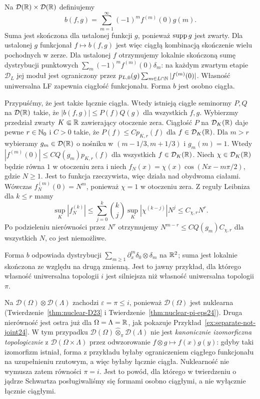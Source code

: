 \begin{przyklad}
\label{ex:separate-not-joint24}
Na $\mathcal D(\mathbb R)\times\mathcal D(\mathbb R)$ definiujemy
\[
 b(f,g)=\sum_{m=1}^\infty (-1)^m f^{(m)}(0)g(m).
\]
Suma jest skończona dla ustalonej funkcji $g$, ponieważ
$\operatorname{supp} g$ jest zwarty. Dla ustalonej $g$ funkcjonał
$f\mapsto b(f,g)$ jest więc ciągłą kombinacją skończenie
wielu pochodnych w zerze. Dla ustalonej $f$ otrzymujemy
lokalnie skończoną sumę dystrybucji punktowych
$\sum_m(-1)^mf^{(m)}(0)\delta_m$: na każdym zwartym
etapie $\mathcal D_L$ jej moduł jest ograniczony przez
$p_{L,0}(g)\sum_{m\in L\cap\mathbb N}|f^{(m)}(0)|$.
Własność uniwersalna LF zapewnia ciągłość funkcjonału. Forma $b$ jest osobno ciągła.

Przypuśćmy, że jest także łącznie ciągła. Wtedy istnieją
ciągłe seminormy $P,Q$ na $\mathcal D(\mathbb R)$ takie, że
$|b(f,g)|\le P(f)Q(g)$ dla wszystkich $f,g$.
Wybierzmy przedział zwarty $K\Subset\mathbb R$ zawierający
otoczenie zera. Ciągłość $P$ na $\mathcal D_K(\mathbb R)$
daje pewne $r\in\mathbb N_0$ i $C>0$ takie, że
$P(f)\le Cp_{K,r}(f)$ dla $f\in\mathcal D_K(\mathbb R)$.
Dla $m>r$ wybieramy $g_m\in\mathcal D(\mathbb R)$ o nośniku
w $(m-1/3,m+1/3)$ i $g_m(m)=1$. Wtedy
$|f^{(m)}(0)|\le CQ(g_m)p_{K,r}(f)$ dla wszystkich
$f\in\mathcal D_K(\mathbb R)$. Niech $\chi\in\mathcal D_K(\mathbb R)$
będzie równa $1$ w otoczeniu zera i niech
$f_N(x)=\chi(x)\cos(Nx-m\pi/2)$, gdzie $N\ge1$.
Jest to funkcja rzeczywista, więc działa nad obydwoma
ciałami. Wówczas $f_N^{(m)}(0)=N^m$, ponieważ
$\chi=1$ w otoczeniu zera. Z reguły Leibniza
dla $k\le r$ mamy
\[
 \sup_K|f_N^{(k)}|
 \le\sum_{j=0}^k\binom{k}{j}\sup_K|\chi^{(k-j)}|N^j
 \le C_{\chi,r}N^r.
\]
Po podzieleniu nierówności przez $N^r$ otrzymujemy
$N^{m-r}\le C Q(g_m) C_{\chi,r}$ dla wszystkich $N$,
co jest niemożliwe.

Forma $b$ odpowiada dystrybucji
$\sum_{m\ge1}\partial_x^m\delta_0\otimes\delta_m$
na $\mathbb R^2$; suma jest lokalnie skończona ze względu
na drugą zmienną. Jest to jawny przykład, dla którego
własność uniwersalna topologii $i$ jest silniejsza
niż własność uniwersalna topologii $\pi$.
\end{przyklad}

\begin{uwaga}
\label{rem:D-not-projective24}
Na $\mathcal D(\Omega)\otimes\mathcal D(\Lambda)$
zachodzi $\varepsilon=\pi\le i$, ponieważ
$\mathcal D(\Omega)$ jest nuklearna
(Twierdzenie~\ref{thm:nuclear-D23} i
Twierdzenie~\ref{thm:nuclear-pi-eps24}).
Druga nierówność jest ostra już dla $\Omega=\Lambda=\mathbb R$,
jak pokazuje Przykład~\ref{ex:separate-not-joint24}.
W tym przypadku
$\mathcal D(\Omega)\widehat\otimes_\pi\mathcal D(\Lambda)$
nie jest \emph{kanonicznie izomorficzna topologicznie}
z $\mathcal D(\Omega\times\Lambda)$ przez odwzorowanie
$f\otimes g\mapsto f(x)g(y)$: gdyby taki izomorfizm
istniał, forma z przykładu byłaby ograniczeniem
ciągłego funkcjonału na uzupełnieniu rzutowym,
a więc byłaby łącznie ciągła. Nuklearność nie wymusza
zatem równości $\pi=i$. Jest to powód, dla którego
w twierdzeniu o jądrze Schwartza posługiwaliśmy się
formami osobno ciągłymi, a nie wyłącznie łącznie ciągłymi.
\end{uwaga}

